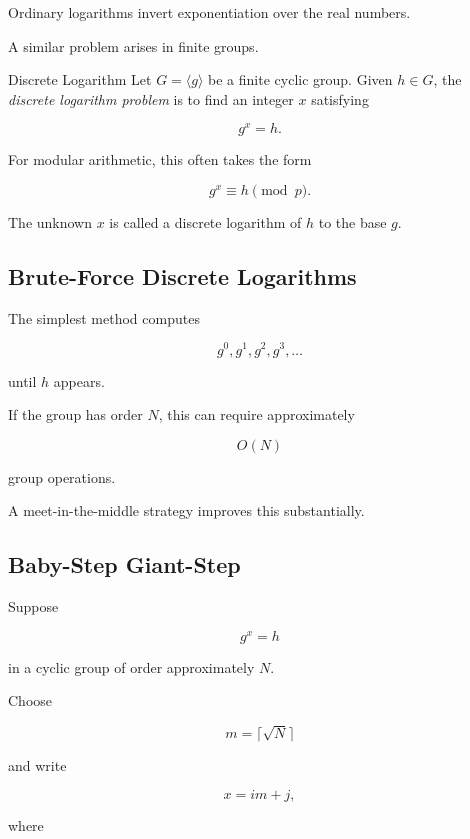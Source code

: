 Ordinary logarithms invert exponentiation over the real numbers.

A similar problem arises in finite groups.

\begin{definitionbox}{Discrete Logarithm}
Let \(G=\langle g\rangle\) be a finite cyclic group. Given \(h\in G\), the
\emph{discrete logarithm problem} is to find an integer \(x\) satisfying

\[ \boxed{g^x=h.} \]
\end{definitionbox}

For modular arithmetic, this often takes the form

\[ g^x\equiv h\pmod p. \]

The unknown \(x\) is called a discrete logarithm of \(h\) to the base \(g\).

\subsection{Brute-Force Discrete Logarithms}
\label{subsec:brute-force-discrete-log}

The simplest method computes

\[ g^0,g^1,g^2,g^3,\ldots \]

until \(h\) appears.

If the group has order \(N\), this can require approximately

\[ O(N) \]

group operations.

A meet-in-the-middle strategy improves this substantially.

\subsection{Baby-Step Giant-Step}
\label{subsec:baby-step-giant-step}

Suppose

\[ g^x=h \]

in a cyclic group of order approximately \(N\).

Choose

\[ m=\lceil\sqrt N\rceil \]

and write

\[ x=im+j, \]

where

